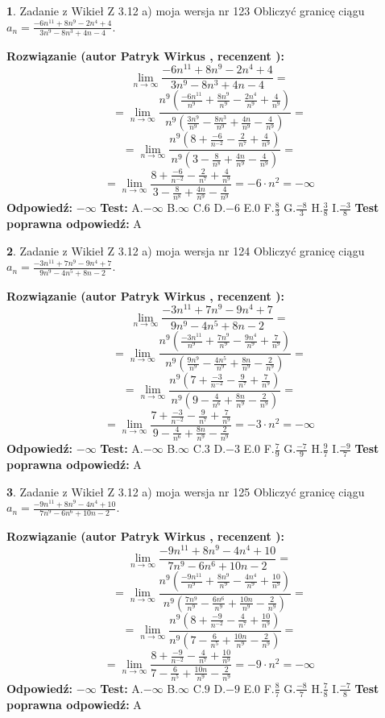 \documentclass[12pt, a4paper]{article}
\theoremstyle{definition} %
\newtheorem{zad}{}
\newcommand{\zadStart}[1]{\begin{zad}#1\newline}
\newcommand{\zadStop}{\end{zad}}
\newcommand{\rozwStart}[2]{\noindent \textbf{Rozwiązanie (autor #1 , recenzent #2): }\newline}
\newcommand{\rozwStop}{\newline}
\newcommand{\odpStart}{\noindent \textbf{Odpowiedź:}\newline}
\newcommand{\odpStop}{\newline}
\newcommand{\testStart}{\noindent \textbf{Test:}\newline}
\newcommand{\testStop}{\newline}
\newcommand{\kluczStart}{\noindent \textbf{Test poprawna odpowiedź:}\newline}
\newcommand{\kluczStop}{\newline}
\begin{document}
\zadStart{Zadanie z Wikieł Z 3.12 a) moja wersja nr 123}
Obliczyć granicę ciągu $a_{n}=\frac{-6n^{11}+8n^{9}-2n^{4}+4}{3n^{9}-8n^{3}+4n-4}$.
\zadStop
\rozwStart{Patryk Wirkus}{}
$$\lim\limits_{n\to\infty}\frac{-6n^{11}+8n^{9}-2n^{4}+4}{3n^{9}-8n^{3}+4n-4}=$$
$$=\lim\limits_{n\to\infty}\frac{n^{9}\left(\frac{-6n^{11}}{n^{9}}+\frac{8n^{9}}{n^{9}}-\frac{2n^{4}}{n^{9}}+\frac{4}{n^{9}}\right)}{n^{9}\left(\frac{3n^{9}}{n^{9}}-\frac{8n^{3}}{n^{9}}+\frac{4n}{n^{9}}-\frac{4}{n^{9}}\right)}=$$
$$=\lim\limits_{n\to\infty}\frac{n^{9}\left(8+\frac{-6}{n^{-2}}-\frac{2}{n^{7}}+\frac{4}{n^{9}}\right)}
{n^{9}\left(3-\frac{8}{n^{8}}+\frac{4n}{n^{9}}-\frac{4}{n^{9}}\right)}=$$
$$=\lim\limits_{n\to\infty}\frac{8+\frac{-6}{n^{-2}}-\frac{2}{n^{7}}+\frac{4}{n^{9}}}{3-\frac{8}{n^{8}}+\frac{4n}{n^{9}}-\frac{4}{n^{9}}}=-6\cdot n^{2} = -\infty$$
\rozwStop
\odpStart
$-\infty$
\odpStop
\testStart
A.$-\infty$
B.$\infty$
C.$6$
D.$-6$
E.$0$
F.$\frac{8}{3}$
G.$\frac{-8}{3}$
H.$\frac{3}{8}$
I.$\frac{-3}{8}$
\testStop
\kluczStart
A
\kluczStop



\zadStart{Zadanie z Wikieł Z 3.12 a) moja wersja nr 124}
Obliczyć granicę ciągu $a_{n}=\frac{-3n^{11}+7n^{9}-9n^{4}+7}{9n^{9}-4n^{5}+8n-2}$.
\zadStop
\rozwStart{Patryk Wirkus}{}
$$\lim\limits_{n\to\infty}\frac{-3n^{11}+7n^{9}-9n^{4}+7}{9n^{9}-4n^{5}+8n-2}=$$
$$=\lim\limits_{n\to\infty}\frac{n^{9}\left(\frac{-3n^{11}}{n^{9}}+\frac{7n^{9}}{n^{9}}-\frac{9n^{4}}{n^{9}}+\frac{7}{n^{9}}\right)}{n^{9}\left(\frac{9n^{9}}{n^{9}}-\frac{4n^{5}}{n^{9}}+\frac{8n}{n^{9}}-\frac{2}{n^{9}}\right)}=$$
$$=\lim\limits_{n\to\infty}\frac{n^{9}\left(7+\frac{-3}{n^{-2}}-\frac{9}{n^{7}}+\frac{7}{n^{9}}\right)}
{n^{9}\left(9-\frac{4}{n^{6}}+\frac{8n}{n^{9}}-\frac{2}{n^{9}}\right)}=$$
$$=\lim\limits_{n\to\infty}\frac{7+\frac{-3}{n^{-2}}-\frac{9}{n^{7}}+\frac{7}{n^{9}}}{9-\frac{4}{n^{6}}+\frac{8n}{n^{9}}-\frac{2}{n^{9}}}=-3\cdot n^{2} = -\infty$$
\rozwStop
\odpStart
$-\infty$
\odpStop
\testStart
A.$-\infty$
B.$\infty$
C.$3$
D.$-3$
E.$0$
F.$\frac{7}{9}$
G.$\frac{-7}{9}$
H.$\frac{9}{7}$
I.$\frac{-9}{7}$
\testStop
\kluczStart
A
\kluczStop



\zadStart{Zadanie z Wikieł Z 3.12 a) moja wersja nr 125}
Obliczyć granicę ciągu $a_{n}=\frac{-9n^{11}+8n^{9}-4n^{4}+10}{7n^{9}-6n^{6}+10n-2}$.
\zadStop
\rozwStart{Patryk Wirkus}{}
$$\lim\limits_{n\to\infty}\frac{-9n^{11}+8n^{9}-4n^{4}+10}{7n^{9}-6n^{6}+10n-2}=$$
$$=\lim\limits_{n\to\infty}\frac{n^{9}\left(\frac{-9n^{11}}{n^{9}}+\frac{8n^{9}}{n^{9}}-\frac{4n^{4}}{n^{9}}+\frac{10}{n^{9}}\right)}{n^{9}\left(\frac{7n^{9}}{n^{9}}-\frac{6n^{6}}{n^{9}}+\frac{10n}{n^{9}}-\frac{2}{n^{9}}\right)}=$$
$$=\lim\limits_{n\to\infty}\frac{n^{9}\left(8+\frac{-9}{n^{-2}}-\frac{4}{n^{7}}+\frac{10}{n^{9}}\right)}
{n^{9}\left(7-\frac{6}{n^{5}}+\frac{10n}{n^{9}}-\frac{2}{n^{9}}\right)}=$$
$$=\lim\limits_{n\to\infty}\frac{8+\frac{-9}{n^{-2}}-\frac{4}{n^{7}}+\frac{10}{n^{9}}}{7-\frac{6}{n^{5}}+\frac{10n}{n^{9}}-\frac{2}{n^{9}}}=-9\cdot n^{2} = -\infty$$
\rozwStop
\odpStart
$-\infty$
\odpStop
\testStart
A.$-\infty$
B.$\infty$
C.$9$
D.$-9$
E.$0$
F.$\frac{8}{7}$
G.$\frac{-8}{7}$
H.$\frac{7}{8}$
I.$\frac{-7}{8}$
\testStop
\kluczStart
A
\kluczStop
\end{document}
